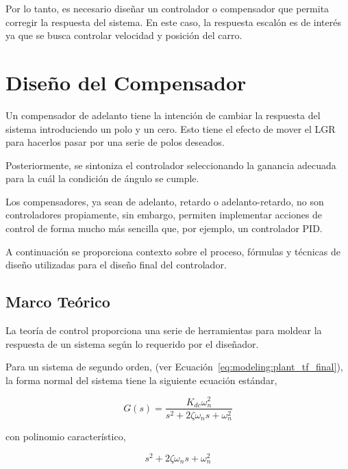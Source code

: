 \documentclass[12pt,a4paper]{article}
\begin{document}
        Por lo tanto, es necesario diseñar un controlador o compensador que permita corregir la respuesta del 
        sistema. En este caso, la respuesta escalón es de interés ya que se busca controlar velocidad y posición 
        del carro. 

  \pagebreak


  \section{Diseño del Compensador}

      Un compensador de adelanto tiene la intención de cambiar la respuesta del sistema introduciendo un polo y un cero. Esto 
      tiene el efecto de mover el LGR para hacerlos pasar por una serie de polos deseados. 

      Posteriormente, se sintoniza el controlador seleccionando la ganancia adecuada para la cuál la condición de ángulo 
      se cumple. 

      Los compensadores, ya sean de adelanto, retardo o adelanto-retardo, no son controladores propiamente, sin embargo, permiten
      implementar acciones de control de forma mucho más sencilla que, por ejemplo, un controlador PID. 

      A continuación se proporciona contexto sobre el proceso, fórmulas y técnicas de diseño utilizadas para 
      el diseño final del controlador.

      \subsection{Marco Teórico}

        La teoría de control proporciona una serie de herramientas para moldear la respuesta de un sistema según 
        lo requerido por el diseñador. 

        Para un sistema de segundo orden, (ver Ecuación~\ref{eq:modeling:plant_tf_final}), la forma normal del sistema 
        tiene la siguiente ecuación estándar, 

        \begin{equation}
          G\left(s\right) = \frac{K_{dc}\omega_{n}^{2}}{s^{2} + 2\zeta\omega_{n}s + \omega_{n}^{2}}
          \label{eq:design:2ndorder_std}
        \end{equation}

        con polinomio característico, 

        \begin{equation}
          s^{2} + 2\zeta\omega_{n}s + \omega_{n}^{2}
          \label{eq:design:2ndorder_std_charact}
        \end{equation}
\end{document}
